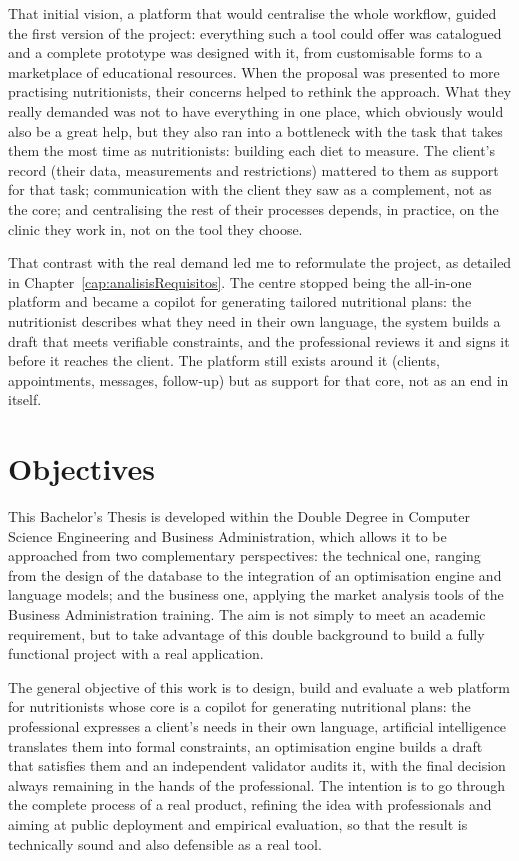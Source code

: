 That initial vision, a platform that would centralise the whole workflow, guided the first version of the project: everything such a tool could offer was catalogued and a complete prototype was designed with it, from customisable forms to a marketplace of educational resources. When the proposal was presented to more practising nutritionists, their concerns helped to rethink the approach. What they really demanded was not to have everything in one place, which obviously would also be a great help, but they also ran into a bottleneck with the task that takes them the most time as nutritionists: building each diet to measure. The client's record (their data, measurements and restrictions) mattered to them as support for that task; communication with the client they saw as a complement, not as the core; and centralising the rest of their processes depends, in practice, on the clinic they work in, not on the tool they choose.

That contrast with the real demand led me to reformulate the project, as detailed in Chapter~\ref{cap:analisisRequisitos}. The centre stopped being the all-in-one platform and became a copilot for generating tailored nutritional plans: the nutritionist describes what they need in their own language, the system builds a draft that meets verifiable constraints, and the professional reviews it and signs it before it reaches the client. The platform still exists around it (clients, appointments, messages, follow-up) but as support for that core, not as an end in itself.


\section*{Objectives}
This Bachelor's Thesis is developed within the Double Degree in Computer Science Engineering and Business Administration, which allows it to be approached from two complementary perspectives: the technical one, ranging from the design of the database to the integration of an optimisation engine and language models; and the business one, applying the market analysis tools of the Business Administration training. The aim is not simply to meet an academic requirement, but to take advantage of this double background to build a fully functional project with a real application.

The general objective of this work is to design, build and evaluate a web platform for nutritionists whose core is a copilot for generating nutritional plans: the professional expresses a client's needs in their own language, artificial intelligence translates them into formal constraints, an optimisation engine builds a draft that satisfies them and an independent validator audits it, with the final decision always remaining in the hands of the professional. The intention is to go through the complete process of a real product, refining the idea with professionals and aiming at public deployment and empirical evaluation, so that the result is technically sound and also defensible as a real tool.

